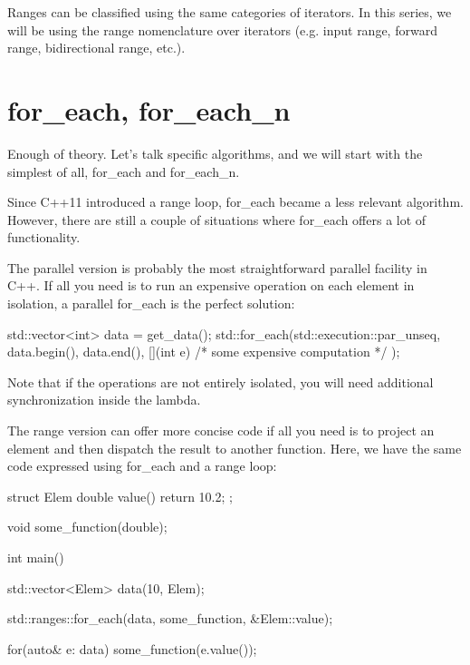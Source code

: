 Ranges can be classified using the same categories of iterators. In this series, we will be using the range nomenclature over iterators (e.g. input range, forward range, bidirectional range, etc.).

\section{for\_each, for\_each\_n}

Enough of theory. Let’s talk specific algorithms, and we will start with the simplest of all, for\_each and for\_each\_n.


Since C++11 introduced a range loop, for\_each became a less relevant algorithm. However, there are still a couple of situations where for\_each offers a lot of functionality.

The parallel version is probably the most straightforward parallel facility in C++. If all you need is to run an expensive operation on each element in isolation, a parallel for\_each is the perfect solution:

\begin{box-note}
\begin{cppcode}
std::vector<int> data = get_data();
std::for_each(std::execution::par_unseq, 
    data.begin(), data.end(),
    [](int e) { /* some expensive computation */ });
\end{cppcode}
\end{box-note}

Note that if the operations are not entirely isolated, you will need additional synchronization inside the lambda.

The range version can offer more concise code if all you need is to project an element and then dispatch the result to another function. Here, we have the same code expressed using for\_each and a range loop:

\begin{box-note}
\begin{cppcode}
struct Elem {
    double value() { return 10.2; }
};

void some_function(double);

int main() {
    std::vector<Elem> data(10, Elem{});
    
    std::ranges::for_each(data, some_function, &Elem::value);

    for(auto& e: data) {
        some_function(e.value());
    }
}
\end{cppcode}
\end{box-note}

